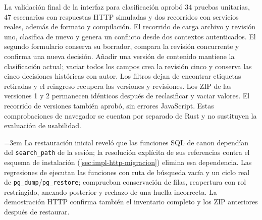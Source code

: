 La validación final de la interfaz para clasificación aprobó 34 pruebas unitarias, 47 escenarios con respuestas HTTP simuladas y dos recorridos con servicios reales, además de formato y compilación. El recorrido de  carga archivo y revisión uno, clasifica de nuevo y genera un conflicto desde dos contextos autenticados. El segundo formulario conserva su borrador, compara la revisión concurrente y confirma una nueva decisión. Añadir una versión de contenido mantiene la clasificación actual; vaciar todos los campos crea la revisión cinco y conserva las cinco decisiones históricas con autor. Los filtros dejan de encontrar etiquetas retiradas y el reingreso recupera las versiones y revisiones. Los ZIP de las versiones 1 y 2 permanecen idénticos después de reclasificar y vaciar valores. El recorrido de versiones también aprobó, sin errores JavaScript. Estas comprobaciones de navegador se cuentan por separado de Rust y no sustituyen la evaluación de usabilidad.

{\emergencystretch=3em La restauración inicial reveló que las funciones SQL de canon dependían del \texttt{search\_path} de la sesión; la resolución explícita de sus referencias contra el esquema de instalación (\cref{sec:impl-http-migracion}) elimina esa dependencia. Las regresiones de  ejecutan las funciones con ruta de búsqueda vacía y un ciclo real de \texttt{pg\_dump}/\texttt{pg\_restore}; comprueban conservación de filas, reapertura con rol restringido, anexado posterior y rechazo de una huella incorrecta. La demostración HTTP confirma también el inventario completo y los ZIP anteriores después de restaurar.\par}









